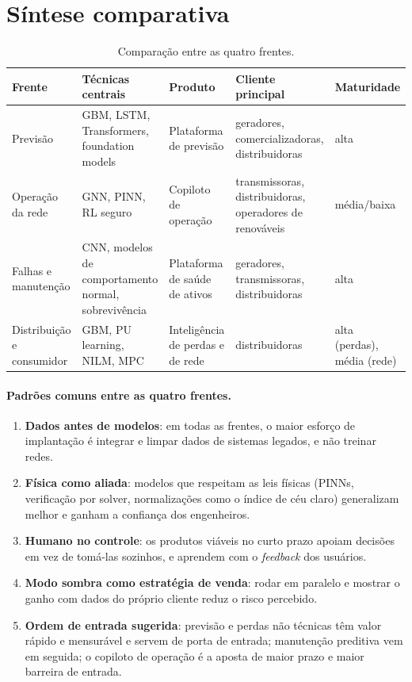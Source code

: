 \documentclass[11pt,a4paper]{article}
\begin{document}
\section{Síntese comparativa}

\begin{table}[h]
\centering
\small
\begin{tabularx}{\textwidth}{l L L L l}
\toprule
\textbf{Frente} & \textbf{Técnicas centrais} & \textbf{Produto} &
  \textbf{Cliente principal} & \textbf{Maturidade} \\
\midrule
Previsão & GBM, LSTM, Transformers, foundation models &
  Plataforma de previsão & geradores, comercializadoras, distribuidoras &
  alta \\
Operação da rede & GNN, PINN, RL seguro & Copiloto de operação &
  transmissoras, distribuidoras, operadores de renováveis & média/baixa \\
Falhas e manutenção & CNN, modelos de comportamento normal, sobrevivência &
  Plataforma de saúde de ativos & geradores, transmissoras, distribuidoras &
  alta \\
Distribuição e consumidor & GBM, PU learning, NILM, MPC &
  Inteligência de perdas e de rede & distribuidoras & alta (perdas),
  média (rede) \\
\bottomrule
\end{tabularx}
\caption{Comparação entre as quatro frentes.}
\end{table}

\paragraph{Padrões comuns entre as quatro frentes.}
\begin{enumerate}
  \item \textbf{Dados antes de modelos}: em todas as frentes, o maior esforço
    de implantação é integrar e limpar dados de sistemas legados, e não
    treinar redes.
  \item \textbf{Física como aliada}: modelos que respeitam as leis físicas
    (PINNs, verificação por solver, normalizações como o índice de céu claro)
    generalizam melhor e ganham a confiança dos engenheiros.
  \item \textbf{Humano no controle}: os produtos viáveis no curto prazo apoiam
    decisões em vez de tomá-las sozinhos, e aprendem com o
    \textit{feedback} dos usuários.
  \item \textbf{Modo sombra como estratégia de venda}: rodar em paralelo e
    mostrar o ganho com dados do próprio cliente reduz o risco percebido.
  \item \textbf{Ordem de entrada sugerida}: previsão e perdas não técnicas têm
    valor rápido e mensurável e servem de porta de entrada; manutenção
    preditiva vem em seguida; o copiloto de operação é a aposta de maior
    prazo e maior barreira de entrada.
\end{enumerate}
\end{document}
